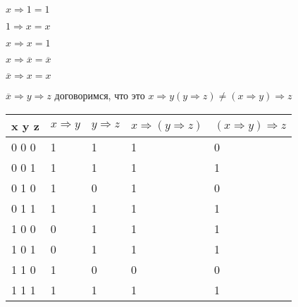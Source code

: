 \documentclass[russian]{lecture-notes}
\begin{document}
\begin{sloppypar}
\begin{proposition}
            $x\Rightarrow 1 = 1$

            $1 \Rightarrow x = x$

            $x \Rightarrow x = 1$

            $x \Rightarrow \overline{x} = \overline{x}$

            $\overline{x} \Rightarrow x = x$

            $\overline{x} \Rightarrow y \Rightarrow z$ договоримся, что это $x \Rightarrow y (y\Rightarrow z) \neq (x \Rightarrow y) \Rightarrow z$

            \begin{table}[h!]
                \centering
                \begin{tabular}{|l|l|l|l|l|}
                    \hline
                    x y z & $x \Rightarrow y$ & $y \Rightarrow z$ & $x \Rightarrow (y \Rightarrow z)$ & $(x \Rightarrow y) \Rightarrow z$ \\ \hline
                    0 0 0  & 1                 & 1                 & 1                                 & 0                                 \\ \hline
                    0 0 1 & 1                 & 1                 & 1                                 & 1                                 \\ \hline
                    0 1 0 & 1                 & 0                 & 1                                 & 0                                 \\ \hline
                    0 1 1 & 1                 & 1                 & 1                                 & 1                                 \\ \hline
                    1 0 0 & 0                 & 1                 & 1                                 & 1                                 \\ \hline
                    1 0 1 & 0                 & 1                 & 1                                 & 1                                 \\ \hline
                    1 1 0 & 1                 & 0                 & 0                                 & 0                                 \\ \hline
                    1 1 1 & 1                 & 1                 & 1                                 & 1                                 \\ \hline
                \end{tabular}
            \end{table}


\end{proposition}
\end{sloppypar}
\end{document}
